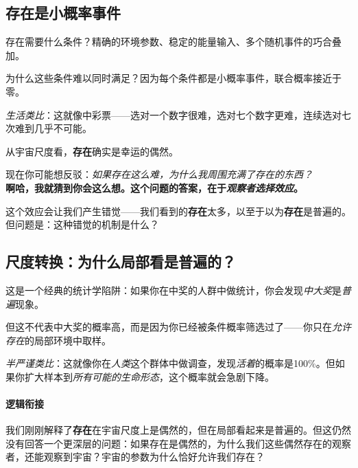 \documentclass[../main.tex]{subfiles}
\begin{document}
	\subsection{存在是小概率事件}

	存在需要什么条件？精确的环境参数、稳定的能量输入、多个随机事件的巧合叠加。

	为什么这些条件难以同时满足？因为每个条件都是小概率事件，联合概率接近于零。

	\textit{生活类比}：这就像中彩票——选对一个数字很难，选对七个数字更难，连续选对七次难到几乎不可能。

	从宇宙尺度看，\textbf{存在}确实是幸运的偶然。

	\begin{tcolorbox}[colback=yellow!5, title=\textit{读者行为预测}]
		现在你可能想反驳：\textit{如果存在这么难，为什么我周围充满了存在的东西？}\\
		\textbf{啊哈，我就猜到你会这么想。这个问题的答案，在于\textit{观察者选择效应}。}
	\end{tcolorbox}

	这个效应会让我们产生错觉——我们看到的\textbf{存在}太多，以至于以为\textbf{存在}是普遍的。但问题是：这种错觉的机制是什么？

	\subsection{尺度转换：为什么局部看是普遍的？}

	这是一个经典的统计学陷阱：如果你在中奖的人群中做统计，你会发现\textit{中大奖}是\textit{普遍}现象。

	但这不代表中大奖的概率高，而是因为你已经被条件概率筛选过了——你只在\textit{允许存在}的局部环境中取样。

	\textit{半严谨类比}：这就像你在\textit{人类}这个群体中做调查，发现\textit{活着}的概率是100\%。但如果你扩大样本到\textit{所有可能的生命形态}，这个概率就会急剧下降。

	\paragraph*{逻辑衔接}
	我们刚刚解释了\textbf{存在}在宇宙尺度上是偶然的，但在局部看起来是普遍的。但这仍然没有回答一个更深层的问题：如果存在是偶然的，为什么我们这些偶然存在的观察者，还能观察到宇宙？宇宙的参数为什么恰好允许我们存在？
\end{document}
